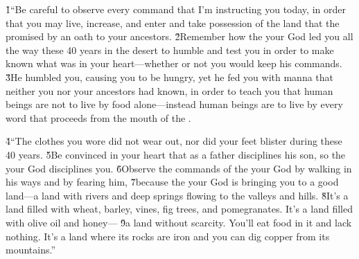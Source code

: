 \v{1}``Be careful to observe every command that I'm instructing you today, in order that you may live, increase, and enter and take possession of the land that the  promised by an oath to your ancestors. \v{2}Remember how the  your God led you all the way these 40 years in the desert to humble and test you in order to make known what was in your heart---whether or not you would keep his commands. \v{3}He humbled you, causing you to be hungry, yet he fed you with manna that neither you nor your ancestors had known, in order to teach you that human beings are not to live by food alone---instead human beings are to live by every word that proceeds from the mouth of the .

\v{4}``The clothes you wore did not wear out, nor did your feet blister during these 40 years. \v{5}Be convinced in your heart that as a father disciplines his son, so the  your God disciplines you. \v{6}Observe the commands of the  your God by walking in his ways and by fearing him, \v{7}because the  your God is bringing you to a good land---a land with rivers and deep springs flowing to the valleys and hills. \v{8}It's a land filled with wheat, barley, vines, fig trees, and pomegranates. It's a land filled with olive oil and honey--- \v{9}a land without scarcity. You'll eat food in it and lack nothing. It's a land where its rocks are iron and you can dig copper from its mountains.''

